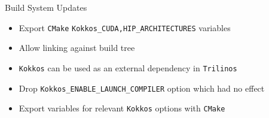 


\begin{frame}[fragile]{Build System Updates}
\begin{itemize}
  \item Export \texttt{CMake} \texttt{Kokkos\_{CUDA,HIP}\_ARCHITECTURES} variables
  \item Allow linking against build tree
  \item \texttt{Kokkos} can be used as an external dependency in \texttt{Trilinos}
  \item Drop \texttt{Kokkos\_ENABLE\_LAUNCH\_COMPILER} option which had no effect
  \item Export variables for relevant \texttt{Kokkos} options with \texttt{CMake}
\end{itemize}
\end{frame}


